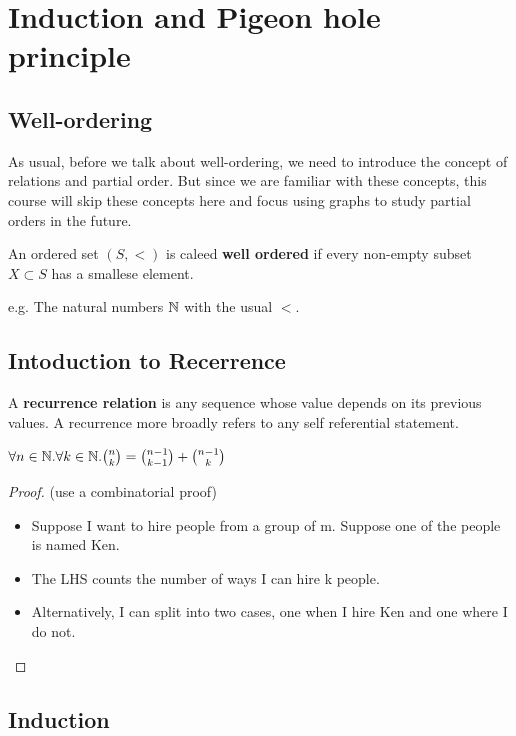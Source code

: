 \chapter{Induction and Pigeon hole principle}

\section{Well-ordering}
As usual, before we talk about well-ordering, we need to introduce the concept of relations and partial order. But since we are familiar with these concepts, this course will skip these concepts here and focus using graphs to study partial orders in the future.
\begin{definition}
    An ordered set $(S,<)$ is caleed \textbf{well ordered} if every non-empty subset $X \subset S$ has a smallese element.
\end{definition}
e.g. The natural numbers $\mathbb{N}$ with the usual $<$.

\section{Intoduction to Recerrence}
\begin{definition}
    A \textbf{recurrence relation} is any sequence whose value depends on its previous values. 
    A recurrence more broadly refers to any self referential statement.
\end{definition}

\begin{theorem}
    $\forall n \in \mathbb{N}. \forall k \in \mathbb{N}. {n \choose k}={n-1 \choose k-1}+{n-1 \choose k}$
\end{theorem}
\begin{proof}
    (use a combinatorial proof)
    \begin{itemize}
        \item Suppose I want to hire people from a group of m. Suppose one of the people is named Ken.
        \item The LHS counts the number of ways I can hire k people.
        \item Alternatively, I can split into two cases, one when I hire Ken and one where I do not.
    \end{itemize}
\end{proof}

\section{Induction}

